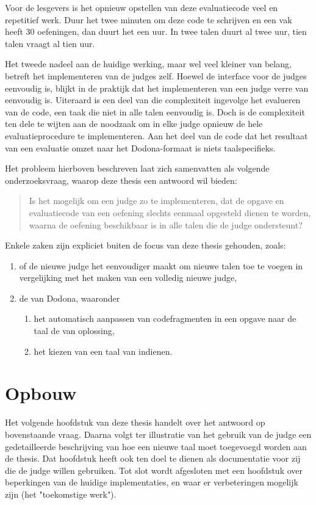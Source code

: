 Voor de lesgevers is het opnieuw opstellen van deze evaluatiecode veel en repetitief werk.
Duur het twee minuten om deze code te schrijven en een vak heeft 30 oefeningen, dan duurt het een uur.
In twee talen duurt al twee uur, tien talen vraagt al tien uur.

Het tweede nadeel aan de huidige werking, maar wel veel kleiner van belang, betreft het implementeren van de judges zelf.
Hoewel de interface voor de judges eenvoudig is, blijkt in de praktijk dat het implementeren van een judge verre van eenvoudig is.
Uiteraard is een deel van die complexiteit ingevolge het evalueren van de code, een taak die niet in alle talen eenvoudig is.
Doch is de complexiteit ten dele te wijten aan de noodzaak om in elke judge opnieuw de hele evaluatieprocedure te implementeren.
Aan het deel van de code dat het resultaat van een evaluatie omzet naar het Dodona-formaat is niets taalspecifieks.

Het probleem hierboven beschreven laat zich samenvatten als volgende onderzoeksvraag, waarop deze thesis een antwoord wil bieden:

\begin{quote}
    Is het mogelijk om een judge zo te implementeren, dat de opgave en evaluatiecode van een oefening slechts eenmaal opgesteld dienen te worden, waarna de oefening beschikbaar is in alle talen die de judge ondersteunt?
\end{quote}

Enkele zaken zijn expliciet buiten de focus van deze thesis gehouden, zoals:

\begin{enumerate}
    \item of de nieuwe judge het eenvoudiger maakt om nieuwe talen toe te voegen in vergelijking met het maken van een volledig nieuwe judge,
    \item de  van Dodona, waaronder
        \begin{enumerate}
                  \item het automatisch aanpassen van codefragmenten in een opgave naar de taal de van oplossing,
                  \item het kiezen van een taal van indienen.
        \end{enumerate}
\end{enumerate}

\section{Opbouw}\label{sec:opbouw}

Het volgende hoofdstuk van deze thesis handelt over het antwoord op bovenstaande vraag.
Daarna volgt ter illustratie van het gebruik van de judge een gedetailleerde beschrijving van hoe een nieuwe taal moet toegevoegd worden aan de thesis.
Dat hoofdstuk heeft ook ten doel te dienen als documentatie voor zij die de judge willen gebruiken.
Tot slot wordt afgesloten met een hoofdstuk over beperkingen van de huidige implementaties, en waar er verbeteringen mogelijk zijn (het "toekomstige werk").
